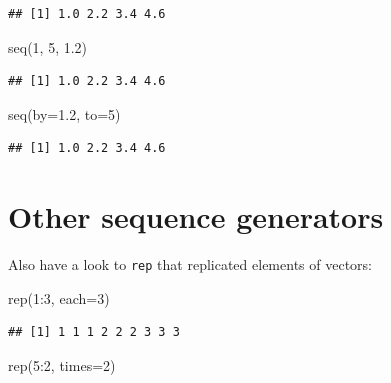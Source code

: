 \documentclass[
]{book}
\newenvironment{Shaded}{\begin{snugshade}}{\end{snugshade}}
\newcommand{\AttributeTok}[1]{\textcolor[rgb]{0.77,0.63,0.00}{#1}}
\newcommand{\DecValTok}[1]{\textcolor[rgb]{0.00,0.00,0.81}{#1}}
\newcommand{\FloatTok}[1]{\textcolor[rgb]{0.00,0.00,0.81}{#1}}
\newcommand{\FunctionTok}[1]{\textcolor[rgb]{0.00,0.00,0.00}{#1}}
\newcommand{\NormalTok}[1]{#1}
\newcommand{\SpecialCharTok}[1]{\textcolor[rgb]{0.00,0.00,0.00}{#1}}
\begin{document}
\begin{verbatim}
## [1] 1.0 2.2 3.4 4.6
\end{verbatim}

\begin{Shaded}
\begin{Highlighting}[]
\FunctionTok{seq}\NormalTok{(}\DecValTok{1}\NormalTok{, }\DecValTok{5}\NormalTok{, }\FloatTok{1.2}\NormalTok{)}
\end{Highlighting}
\end{Shaded}

\begin{verbatim}
## [1] 1.0 2.2 3.4 4.6
\end{verbatim}

\begin{Shaded}
\begin{Highlighting}[]
\FunctionTok{seq}\NormalTok{(}\AttributeTok{by=}\FloatTok{1.2}\NormalTok{, }\AttributeTok{to=}\DecValTok{5}\NormalTok{)}
\end{Highlighting}
\end{Shaded}

\begin{verbatim}
## [1] 1.0 2.2 3.4 4.6
\end{verbatim}

\hypertarget{other-sequence-generators}{%
\section{Other sequence generators}\label{other-sequence-generators}}

Also have a look to \texttt{rep} that replicated elements of vectors:

\begin{Shaded}
\begin{Highlighting}[]
\FunctionTok{rep}\NormalTok{(}\DecValTok{1}\SpecialCharTok{:}\DecValTok{3}\NormalTok{, }\AttributeTok{each=}\DecValTok{3}\NormalTok{)}
\end{Highlighting}
\end{Shaded}

\begin{verbatim}
## [1] 1 1 1 2 2 2 3 3 3
\end{verbatim}

\begin{Shaded}
\begin{Highlighting}[]
\FunctionTok{rep}\NormalTok{(}\DecValTok{5}\SpecialCharTok{:}\DecValTok{2}\NormalTok{, }\AttributeTok{times=}\DecValTok{2}\NormalTok{)}
\end{Highlighting}
\end{Shaded}
\end{document}
